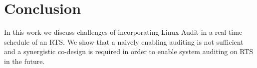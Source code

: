\section{Conclusion}

In this work we discuss challenges of incorporating Linux Audit in a real-time schedule of an RTS. We show that a naively enabling auditing is not sufficient and a synergistic co-design is required in order to enable system auditing on RTS in the future.
